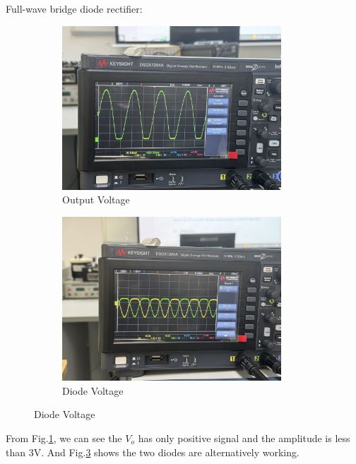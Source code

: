 Full-wave bridge diode rectifier:\par
    \begin{figure}[h]
        \centering
        \begin{subfigure}[h]{0.45\textwidth}
            \centering
            \includegraphics[width=0.9\textwidth]{Lab03/Images/3.5_outPutVoltage.jpg}
            \caption{Output Voltage}
            \label{L3.5OV}
        \end{subfigure}
        \hfill
        \begin{subfigure}[h]{0.45\textwidth}
            \centering
            \includegraphics[width=0.9\textwidth]{Lab03/Images/3.5_diodeVoltage.jpg}
            \caption{Diode Voltage}
            \label{L3.5DV}
        \end{subfigure}
    \end{figure}
    \FloatBarrier
From Fig.\ref{L3.5OV}, we can see the $V_o$ has only positive signal and the amplitude is less than 3V. And Fig.\ref{L3.5DV} shows the two diodes are alternatively working.

